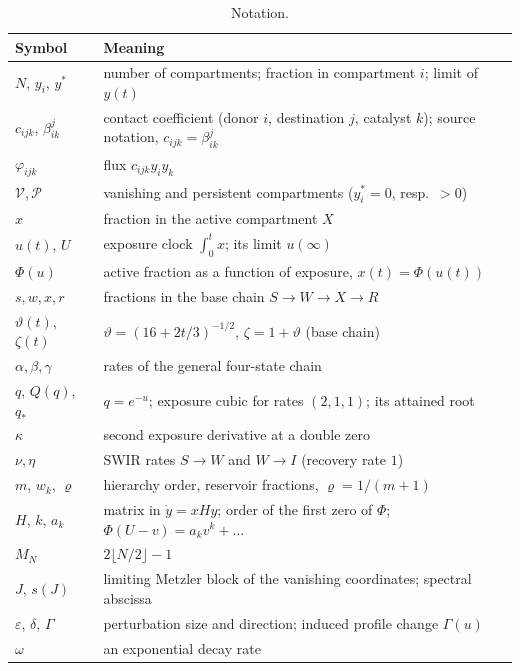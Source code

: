 \documentclass[11pt,a4paper]{article}
\theoremstyle{definition}\newtheorem{definition}[theorem]{Definition}
\theoremstyle{remark}\newtheorem{remark}[theorem]{Remark}
\newcommand{\Vs}{\mathcal V}
\newcommand{\Ps}{\mathcal P}
\begin{document}
\begin{table}[ht]
\centering\small
\begin{tabularx}{\textwidth}{@{}lX@{}}
\toprule
Symbol & Meaning\\
\midrule
$N$, $y_i$, $y^*$ & number of compartments; fraction in compartment $i$; limit of $y(t)$\\
$c_{ijk}$, $\beta^j_{ik}$ & contact coefficient (donor $i$, destination $j$, catalyst $k$); source notation, $c_{ijk}=\beta^j_{ik}$\\
$\varphi_{ijk}$ & flux $c_{ijk}y_iy_k$\\
$\Vs,\Ps$ & vanishing and persistent compartments ($y_i^*=0$, resp.\ $>0$)\\
$x$ & fraction in the active compartment $X$\\
$u(t)$, $U$ & exposure clock $\int_0^tx$; its limit $u(\infty)$\\
$\Phi(u)$ & active fraction as a function of exposure, $x(t)=\Phi(u(t))$\\
$s,w,x,r$ & fractions in the base chain $S\to W\to X\to R$\\
$\vartheta(t)$, $\zeta(t)$ & $\vartheta=(16+2t/3)^{-1/2}$, $\zeta=1+\vartheta$ (base chain)\\
$\alpha,\beta,\gamma$ & rates of the general four-state chain\\
$q$, $Q(q)$, $q_*$ & $q=e^{-u}$; exposure cubic for rates $(2,1,1)$; its attained root\\
$\kappa$ & second exposure derivative at a double zero\\
$\nu,\eta$ & SWIR rates $S\to W$ and $W\to I$ (recovery rate $1$)\\
$m$, $w_k$, $\varrho$ & hierarchy order, reservoir fractions, $\varrho=1/(m+1)$\\
$H$, $k$, $a_k$ & matrix in $\dot y=xHy$; order of the first zero of $\Phi$; $\Phi(U-v)=a_kv^k+\dots$\\
$M_N$ & $2\lfloor N/2\rfloor-1$\\
$J$, $s(J)$ & limiting Metzler block of the vanishing coordinates; spectral abscissa\\
$\varepsilon$, $\delta$, $\Gamma$ & perturbation size and direction; induced profile change $\Gamma(u)$\\
$\omega$ & an exponential decay rate\\
\bottomrule
\end{tabularx}
\caption{Notation.}
\label{tab:notation}
\end{table}
\end{document}
